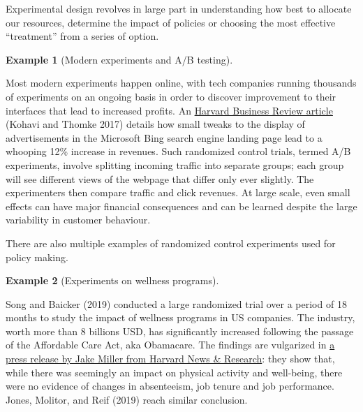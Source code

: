 \documentclass[
  11pt,
  letterpaper,
]{scrbook}
\theoremstyle{definition}
\newtheorem{example}{Example}[chapter]
\theoremstyle{remark}
\begin{document}
Experimental design revolves in large part in understanding how best to
allocate our resources, determine the impact of policies or choosing the
most effective ``treatment'' from a series of option.

\begin{example}[Modern experiments and A/B
testing]\protect\hypertarget{exm-experimentalexample1}{}\label{exm-experimentalexample1}

Most modern experiments happen online, with tech companies running
thousands of experiments on an ongoing basis in order to discover
improvement to their interfaces that lead to increased profits. An
\href{https://hbr.org/2017/09/the-surprising-power-of-online-experiments}{Harvard
Business Review article} (Kohavi and Thomke 2017) details how small
tweaks to the display of advertisements in the Microsoft Bing search
engine landing page lead to a whooping 12\% increase in revenues. Such
randomized control trials, termed A/B experiments, involve splitting
incoming traffic into separate groups; each group will see different
views of the webpage that differ only ever slightly. The experimenters
then compare traffic and click revenues. At large scale, even small
effects can have major financial consequences and can be learned despite
the large variability in customer behaviour.

\end{example}

There are also multiple examples of randomized control experiments used
for policy making.

\begin{example}[Experiments on wellness
programs]\protect\hypertarget{exm-experimentvsobservations}{}\label{exm-experimentvsobservations}

Song and Baicker (2019) conducted a large randomized trial over a period
of 18 months to study the impact of wellness programs in US companies.
The industry, worth more than 8 billions USD, has significantly
increased following the passage of the Affordable Care Act, aka
Obamacare. The findings are vulgarized in
\href{https://hms.harvard.edu/news/do-wellness-programs-work}{a press
release by Jake Miller from Harvard News \& Research}: they show that,
while there was seemingly an impact on physical activity and well-being,
there were no evidence of changes in absenteeism, job tenure and job
performance. Jones, Molitor, and Reif (2019) reach similar conclusion.

\end{example}
\end{document}
